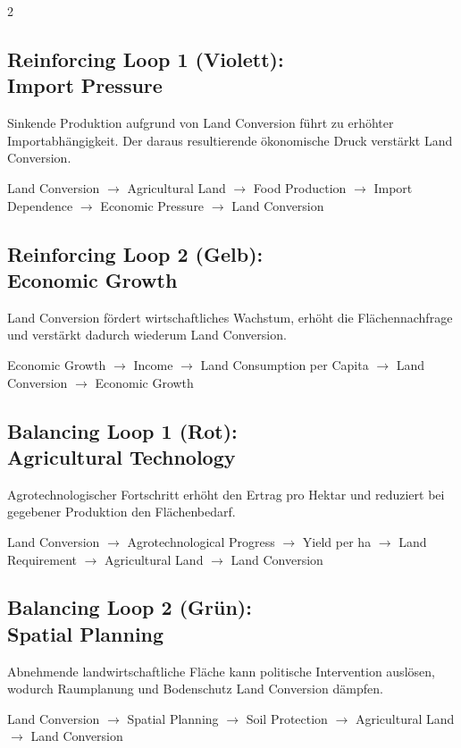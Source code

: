\documentclass[10pt, a4paper]{article}
\begin{document}
\begin{multicols}{2}

\subsection*{Reinforcing Loop 1 (Violett):\\ Import Pressure}
Sinkende Produktion aufgrund von Land Conversion führt zu erhöhter Importabhängigkeit. Der daraus resultierende ökonomische Druck verstärkt Land Conversion.

Land Conversion $\rightarrow$ Agricultural Land $\rightarrow$ Food Production $\rightarrow$ Import Dependence $\rightarrow$ Economic Pressure $\rightarrow$ Land Conversion

\vspace{0.4cm}

\subsection*{Reinforcing Loop 2 (Gelb):\\ Economic Growth}
Land Conversion fördert wirtschaftliches Wachstum, erhöht die Flächennachfrage und verstärkt dadurch wiederum Land Conversion.

Economic Growth $\rightarrow$ Income $\rightarrow$ Land Consumption per Capita $\rightarrow$ Land Conversion $\rightarrow$ Economic Growth

\columnbreak

\subsection*{Balancing Loop 1 (Rot):\\ Agricultural Technology}
Agrotechnologischer Fortschritt erhöht den Ertrag pro Hektar und reduziert bei gegebener Produktion den Flächenbedarf.

Land Conversion $\rightarrow$ Agrotechnological Progress $\rightarrow$ Yield per ha $\rightarrow$ Land Requirement $\rightarrow$ Agricultural Land $\rightarrow$ Land Conversion

\vspace{0.4cm}

\subsection*{Balancing Loop 2 (Grün):\\ Spatial Planning}
Abnehmende landwirtschaftliche Fläche kann politische Intervention auslösen, wodurch Raumplanung und Bodenschutz Land Conversion dämpfen.

Land Conversion $\rightarrow$ Spatial Planning $\rightarrow$ Soil Protection $\rightarrow$ Agricultural Land $\rightarrow$ Land Conversion

\end{multicols}
\end{document}
